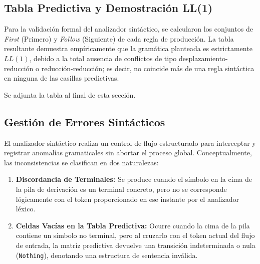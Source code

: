 \documentclass{article}
\begin{document}
\subsection{Tabla Predictiva y Demostración LL(1)}
Para la validación formal del analizador sintáctico, se calcularon los conjuntos de \textit{First} (Primero) y \textit{Follow} (Siguiente) de cada regla de producción. La tabla resultante demuestra empíricamente que la gramática planteada es estrictamente $LL(1)$, debido a la total ausencia de conflictos de tipo desplazamiento-reducción o reducción-reducción; es decir, no coincide más de una regla sintáctica en ninguna de las casillas predictivas. 

Se adjunta la tabla al final de esta sección.

\subsection{Gestión de Errores Sintácticos}
El analizador sintáctico realiza un control de flujo estructurado para interceptar y registrar anomalías gramaticales sin abortar el proceso global. Conceptualmente, las inconsistencias se clasifican en dos naturalezas:

\begin{enumerate}
    \item \textbf{Discordancia de Terminales:} Se produce cuando el símbolo en la cima de la pila de derivación es un terminal concreto, pero no se corresponde lógicamente con el token proporcionado en ese instante por el analizador léxico.
    \item \textbf{Celdas Vacías en la Tabla Predictiva:} Ocurre cuando la cima de la pila contiene un símbolo no terminal, pero al cruzarlo con el token actual del flujo de entrada, la matriz predictiva devuelve una transición indeterminada o nula (\texttt{Nothing}), denotando una estructura de sentencia inválida.
\end{enumerate}
\end{document}
